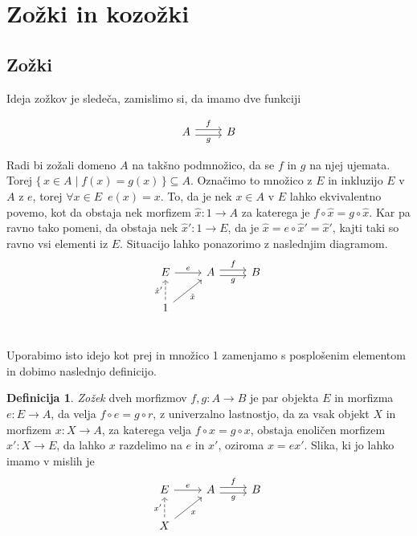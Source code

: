 \documentclass[12pt,a4paper]{book}
\theoremstyle{definition}
\newtheorem{definicija}{Definicija}[chapter]
\theoremstyle{plain}
\theoremstyle{definition}
\theoremstyle{remark}
\renewcommand{\set}[1]{\{\,#1\,\}}
\begin{document}
\section{Zožki in kozožki}

\subsection{Zožki}
Ideja zožkov je sledeča, zamislimo si, da imamo dve funkciji

$$\begin{tikzcd}
A \ar[r, shift left, "f"] \ar[r, shift right, "g"'] & B 
\end{tikzcd}$$

Radi bi zožali domeno $A$ na takšno podmnožico, da se $f$ in $g$ na njej ujemata. Torej $\set{x \in A \mid f(x) = g(x)} \subseteq A$. Označimo to množico z $E$ in inkluzijo $E$ v $A$ z $e$, torej $\forall x \in E \enspace e(x)= x $. To, da je nek $x \in A$ v $E$ lahko ekvivalentno povemo, kot da obstaja nek morfizem $\hat{x} : 1 \to A$ za katerega je $f \circ \hat{x} = g \circ \hat{x}$. Kar pa ravno tako pomeni, da obstaja nek $\hat{x}' : 1 \to E$, da je $\hat{x} = e \circ \hat{x}' = \hat{x}'$, kajti taki so ravno vsi elementi iz $E$. Situacijo lahko ponazorimo z naslednjim diagramom.
$$\begin{tikzcd}
E \ar[r, "e"] & A \ar[r, shift left, "f"] \ar[r, shift right, "g"'] & B \\
1 \ar[u, dashed, "\hat{x}'"] \ar[ur, "\hat{x}"'] \\
\end{tikzcd}$$

Uporabimo isto idejo kot prej in množico 1 zamenjamo s posplošenim elementom in dobimo naslednjo definicijo.

\begin{definicija}
\textit{Zožek} dveh morfizmov $f, g : A \to B$ je par objekta $E$ in morfizma $e : E \to A$, da velja $f \circ e = g \circ r$, z univerzalno lastnostjo, da za vsak objekt $X$ in morfizem $x : X \to A$, za katerega velja $f \circ x = g \circ x$, obstaja enoličen morfizem $x' : X \to E$, da lahko $x$ razdelimo na $e$ in $x'$, oziroma $x = ex'$.
Slika, ki jo lahko imamo v mislih je
$$\begin{tikzcd}
E \ar[r, "e"] & A \ar[r, shift left, "f"] \ar[r, shift right, "g"'] & B \\
X \ar[u, dashed, "x'"] \ar[ur, "x"']
\end{tikzcd}$$

\end{definicija}
\end{document}
